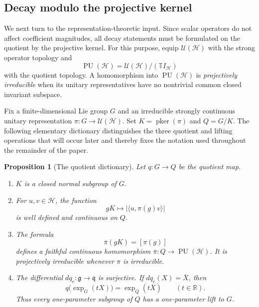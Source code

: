 \documentclass[10pt,a4paper]{amsart}
\numberwithin{equation}{section}
\newtheorem{proposition}[theorem]{Proposition}
\newcommand{\cH}{\mathcal H}
\newcommand{\R}{\mathbb R}
\newcommand{\T}{\mathbb T}
\newcommand{\U}{\mathcal U}
\newcommand{\PU}{\operatorname{PU}}
\newcommand{\pker}{\operatorname{pker}}
\begin{document}
\subsection{Decay modulo the projective kernel}

We next turn to the representation-theoretic input.  Since scalar operators
do not affect coefficient magnitudes, all decay statements must be
formulated on the quotient by the projective kernel.  For this purpose,
equip $\U(\cH)$ with the strong operator topology and
\[
 \PU(\cH)=\U(\cH)/(\T I_{\cH})
\]
with the quotient topology.  A homomorphism into $\PU(\cH)$ is
\emph{projectively irreducible} when its unitary representatives have no
nontrivial common closed invariant subspace.

Fix a finite-dimensional Lie group $G$ and an irreducible strongly continuous
unitary representation $\pi:G\to\U(\cH)$.  Set $K=\pker(\pi)$ and
$Q=G/K$.  The following elementary dictionary distinguishes the three
quotient and lifting operations that will occur later and thereby fixes the
notation used throughout the remainder of the paper.

\begin{proposition}[The quotient dictionary]
\label{prop:quotient-dictionary}
Let $q:G\to Q$ be the quotient map.
\begin{enumerate}[label=\textnormal{(\roman*)}]
\item $K$ is a closed normal subgroup of $G$.
\item For $u,v\in\cH$, the function
\[
 gK\longmapsto |\langle u,\pi(g)v\rangle|
\]
is well defined and continuous on $Q$.
\item The formula
\[
 \overline\pi(gK)=[\pi(g)]
\]
defines a faithful continuous homomorphism
$\overline\pi:Q\to\PU(\cH)$.  It is projectively irreducible whenever
$\pi$ is irreducible.
\item The differential $dq_e:\mathfrak g\to\mathfrak q$ is surjective.  If
$dq_e(X)=\overline X$, then
\begin{equation}\label{eq:quotient-exp-intertwining}
 q\bigl(\exp_G(tX)\bigr)=\exp_Q(t\overline X)
 \qquad(t\in\R).
\end{equation}
Thus every one-parameter subgroup of $Q$ has a one-parameter lift to $G$.
\end{enumerate}
\end{proposition}
\end{document}
